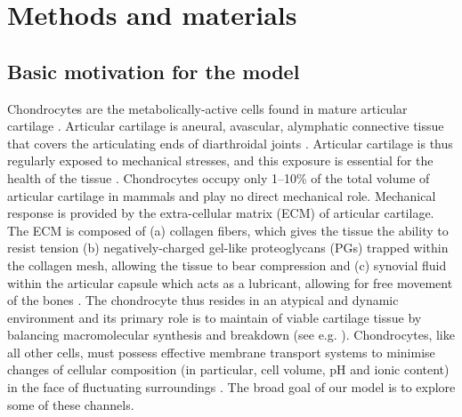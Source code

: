 \section{Methods and materials}
\label{sec:methods-and-materials}


\subsection{Basic motivation for the model}
\label{sec:model-motivation}

Chondrocytes are the metabolically-active cells found in mature
articular cartilage \citep{BarrettJolleyetal2010}. Articular cartilage
is aneural, avascular, alymphatic connective tissue that covers the
articulating ends of diarthroidal joints \citep{Poole1997,
Mankin1982}. Articular cartilage is thus regularly exposed to
mechanical stresses, and this exposure is essential for the health of
the tissue \citep{Stockwell1991}. Chondrocytes occupy only 1--10\% of
the total volume of articular cartilage in mammals
\citep{CarneyMuir1988, Halletal1996} and play no direct mechanical
role. Mechanical response is provided by the extra-cellular matrix
(ECM) of articular cartilage. The ECM is composed of (a) collagen
fibers, which gives the tissue the ability to resist tension (b)
negatively-charged gel-like proteoglycans (PGs) trapped within the
collagen mesh, allowing the tissue to bear compression
\citep{Poole1997, BuckwalterMankin1998} and (c) synovial fluid within
the articular capsule which acts as a lubricant, allowing for free
movement of the bones \citep{Edwards1994}. The chondrocyte thus
resides in an atypical and dynamic environment and its primary role is
to maintain of viable cartilage tissue by balancing macromolecular
synthesis and breakdown (see e.g. \citet{Wilkinsetal2000,
Stockwell1991, Fassbender1987}). Chondrocytes, like all other cells,
must possess effective membrane transport systems to minimise changes
of cellular composition (in particular, cell volume, pH and ionic
content) in the face of fluctuating surroundings \citep{Halletal1996,
  Mobasherietal1998, Stein1990}. The broad goal of our model is to
explore some of these channels.

